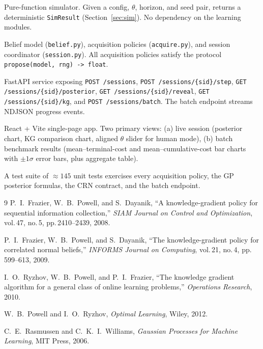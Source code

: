 \documentclass[11pt]{article}
\newcommand{\Cstar}{\theta}
\newcommand{\code}[1]{\texttt{#1}}
\begin{document}
\begin{description}[style=nextline, itemsep=2pt]
  \item[\code{sim/}]
    Pure-function simulator. Given a config, $\Cstar$, horizon, and seed
    pair, returns a deterministic \code{SimResult} (Section~\ref{sec:sim}).
    No dependency on the learning modules.
  \item[\code{policy/}]
    Belief model (\code{belief.py}), acquisition policies
    (\code{acquire.py}), and session coordinator (\code{session.py}).
    All acquisition policies satisfy the protocol
    \code{propose(model, rng) -> float}.
  \item[\code{shell/}]
    FastAPI service exposing \code{POST /sessions},
    \code{POST /sessions/\{sid\}/step}, \code{GET /sessions/\{sid\}/posterior},
    \code{GET /sessions/\{sid\}/reveal}, \code{GET /sessions/\{sid\}/kg},
    and \code{POST /sessions/batch}. The batch endpoint streams
    NDJSON progress events.
  \item[\code{frontend/}]
    React + Vite single-page app. Two primary views: (a) live session
    (posterior chart, KG comparison chart, aligned $\Cstar$ slider for
    human mode), (b) batch benchmark results (mean--terminal-cost and
    mean--cumulative-cost bar charts with $\pm 1\sigma$ error bars, plus
    aggregate table).
\end{description}

A test suite of $\approx 145$ unit tests exercises every acquisition
policy, the GP posterior formulas, the CRN contract, and the batch
endpoint.

\begin{thebibliography}{9}
 P.~I.~Frazier, W.~B.~Powell, and S.~Dayanik,
  ``A knowledge-gradient policy for sequential information collection,''
  \emph{SIAM Journal on Control and Optimization}, vol.\,47, no.\,5,
  pp.\,2410--2439, 2008.

 P.~I.~Frazier, W.~B.~Powell, and S.~Dayanik,
  ``The knowledge-gradient policy for correlated normal beliefs,''
  \emph{INFORMS Journal on Computing}, vol.\,21, no.\,4, pp.\,599--613,
  2009.

 I.~O.~Ryzhov, W.~B.~Powell, and P.~I.~Frazier,
  ``The knowledge gradient algorithm for a general class of online
  learning problems,''
  \emph{Operations Research}, 2010.

 W.~B.~Powell and I.~O.~Ryzhov,
  \emph{Optimal Learning}, Wiley, 2012.

 C.~E.~Rasmussen and C.~K.~I.~Williams,
  \emph{Gaussian Processes for Machine Learning}, MIT Press, 2006.
\end{thebibliography}
\end{document}
